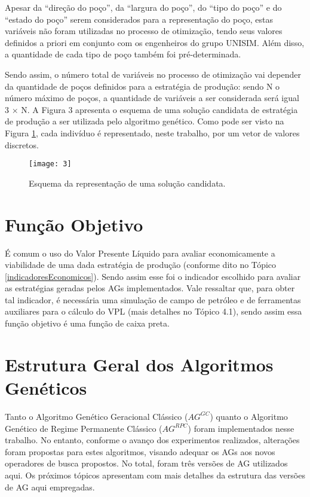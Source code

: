 Apesar da “direção do poço”, da “largura do poço”, do “tipo do poço” e do “estado do poço” serem considerados para a representação do poço, estas variáveis não foram utilizadas no processo de otimização, tendo seus valores definidos a priori em conjunto com os engenheiros do grupo UNISIM. Além disso, a quantidade de cada tipo de poço também foi pré-determinada. 

Sendo assim, o número total de variáveis no processo de otimização vai depender da quantidade de poços definidos para a estratégia de produção: sendo N o número máximo de poços, a quantidade de variáveis a ser considerada será igual 3 $\times$ N. A Figura 3 apresenta o esquema de uma solução candidata de estratégia de produção a ser utilizada pelo algoritmo genético. Como pode ser visto na Figura \ref{fig:fig3_1}, cada indivíduo é representado, neste trabalho, por um vetor de valores discretos.

\begin{figure}[htb]
  \centering
  \texttt{[image: 3]}
  \caption{Esquema da representação de uma solução candidata.}
  \label{fig:fig3_1}
\end{figure}

\section{Função Objetivo}

É comum o uso do Valor Presente Líquido para avaliar economicamente a viabilidade de uma dada estratégia de produção (conforme dito no Tópico \ref{indicadoresEconomicos}). Sendo assim esse foi o indicador escolhido para avaliar as estratégias geradas pelos AGs implementados. Vale ressaltar que, para obter tal indicador, é necessária uma simulação de campo de petróleo e de ferramentas auxiliares para o cálculo do VPL (mais detalhes no Tópico 4.1), sendo assim essa função objetivo é uma função de caixa preta. 

\section{Estrutura Geral dos Algoritmos Genéticos}

Tanto o Algoritmo Genético Geracional Clássico ($AG^{GC}$) quanto o Algoritmo Genético de Regime Permanente Clássico ($AG^{RPC}$) foram implementados nesse trabalho. No entanto, conforme o avanço dos experimentos realizados, alterações foram propostas para estes algoritmos, visando adequar os AGs aos novos operadores de busca propostos.  No total, foram três versões de AG utilizados aqui.  Os próximos tópicos apresentam com mais detalhes da estrutura das versões de AG aqui empregadas.


